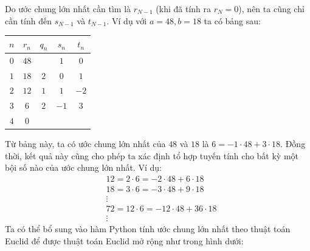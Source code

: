 \begin{multicols}{2}
	Do ước chung lớn nhất cần tìm là $r_{N-1}$ (khi đã tính ra $r_N=0$), nên ta cũng chỉ cần tính đến $s_{N-1}$ và $t_{N-1}$.
	\vskip 0.1cm
	Ví dụ với $a=48,b=18$ ta có bảng sau:
	\begin{table}[H]
		\vspace*{-5pt}
		\centering
		\captionsetup{labelformat= empty, justification=centering}
		\setlength{\tabcolsep}{8pt}
		\renewcommand{\arraystretch}{1.15}
		\begin{tabular}{|c|c|c|c|c|}
			\hline
			$n$	&$r_n$&	$q_n$&	$s_n$&	$t_n$\\
			\hline
			$0$	&$48$&	&	$1$&	$0$\\
			\hline
			$1$	&$18$&	$2$&	$0$&	$1$\\
			\hline
			$2$&	$12$&	$1$&	$1$&	$-2$\\
			\hline
			$3$&	$6$&	$2$&	$-1$&	$3$\\
			\hline
			$4$&	$0$ & & &\\
			\hline	
		\end{tabular}
		\vspace*{-5pt}
	\end{table}		
	Từ bảng này, ta có ước chung lớn nhất của $48$ và $18$ là $6=-1\cdot 48+3\cdot 18$.
	\vskip 0.1cm
	Đồng thời, kết quả này cũng cho phép ta xác định tổ hợp tuyến tính cho bất kỳ một bội số nào của ước chung lớn nhất. Ví dụ:
	\begin{align*}
		&12=2\cdot 6=-2\cdot 48+6\cdot 18 \\
		&18=3\cdot 6=-3\cdot 48+9\cdot 18 \\
		&\vdots\\
		&72=12\cdot 6=-12\cdot 48+36\cdot 18 \\
		&\vdots
	\end{align*}
	Ta có thể bổ sung vào hàm Python tính ước chung lớn nhất theo thuật toán Euclid để được thuật toán Euclid mở rộng như trong hình dưới:
	\begin{figure}[H]
		\centering
		\vspace*{-5pt}
		\captionsetup{labelformat= empty, justification=centering}

\end{figure}
\end{multicols}
